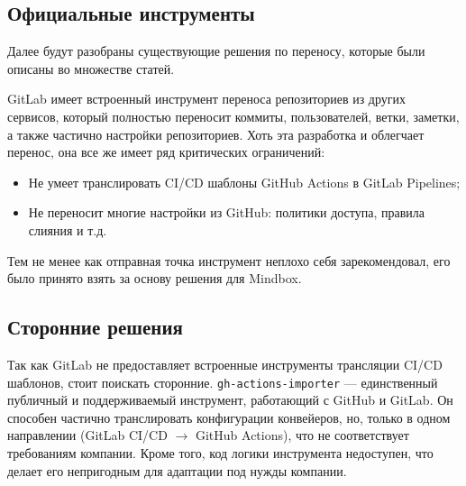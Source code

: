\subsection{Официальные инструменты} \label{subsec:official-migration-instruments}
Далее будут разобраны существующие решения по переносу, которые были описаны во множестве статей.

GitLab имеет встроенный инструмент переноса репозиториев из других сервисов,
который полностью переносит коммиты, пользователей, ветки, заметки, а также частично настройки репозиториев.
Хоть эта разработка и облегчает перенос, она все же имеет ряд критических ограничений:
\begin{itemize}
  \item Не умеет транслировать CI/CD шаблоны GitHub Actions в GitLab Pipelines;
  \item Не переносит многие настройки из GitHub: политики доступа, правила слияния и т.д.
\end{itemize}
Тем не менее как отправная точка инструмент неплохо себя зарекомендовал, его было принято взять за основу решения для Mindbox.

\subsection{Сторонние решения} \label{subsec:third-party-migration-instruments}
Так как GitLab не предоставляет встроенные инструменты трансляции CI/CD шаблонов, стоит поискать сторонние.
\texttt{gh-actions-importer}\cite{gh-actions-migrator} — единственный публичный и поддерживаемый инструмент, работающий с GitHub и GitLab.
Он способен частично транслировать конфигурации конвейеров, но, только в одном направлении (GitLab CI/CD $\rightarrow$ GitHub Actions),
что не соответствует требованиям компании.
Кроме того, код логики инструмента недоступен, что делает его непригодным для адаптации под нужды компании.


